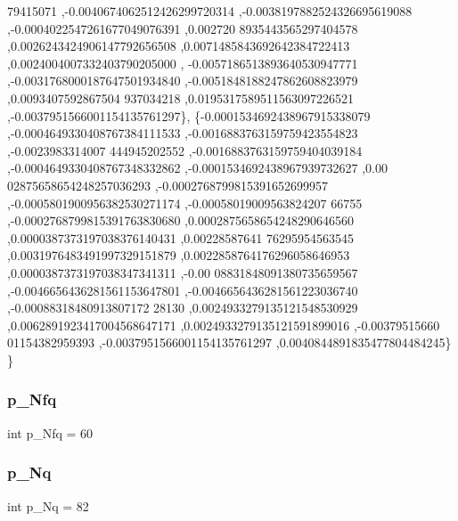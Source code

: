\begin{DoxyCode}
      79415071 ,-0.0040674062512426299720314 ,-0.0038197882524326695619088 ,-0.0004022547261677049076391 ,0.002720
      8935443565297404578 ,0.0026243424906147792656508 ,0.0071485843692642384722413 ,0.0024004007332403790205000 ,
      -0.0057186513893640530947771 ,-0.0031768000187647501934840 ,-0.0051848188247862608823979 ,0.0093407592867504
      937034218 ,0.0195317589511563097226521 ,-0.0037951566001154135761297\},
\{-0.0001534692438967915338079 ,-0.0004649330408767384111533 ,-0.0016883763159759423554823 ,-0.0023983314007
      444945202552 ,-0.0016883763159759404039184 ,-0.0004649330408767348332862 ,-0.0001534692438967939732627 ,0.00
      02875658654248257036293 ,-0.0002768799815391652699957 ,-0.0005801900956382530271174 ,-0.00058019009563824207
      66755 ,-0.0002768799815391763830680 ,0.0002875658654248290646560 ,0.0000387373197038376140431 ,0.00228587641
      76295954563545 ,0.0031976483491997329151879 ,0.0022858764176296058646953 ,0.0000387373197038347341311 ,-0.00
      08831848091380735659567 ,-0.0046656436281561153647801 ,-0.0046656436281561223036740 ,-0.00088318480913807172
      28130 ,0.0024933279135121548530929 ,0.0062891923417004568647171 ,0.0024933279135121591899016 ,-0.00379515660
      01154382959393 ,-0.0037951566001154135761297 ,0.0040844891835477804484245\}
\}
\end{DoxyCode}
\mbox{\label{a00461_aa030b0a9fe619a48647119bacea600e0}} 
\subsubsection{\texorpdfstring{p\+\_\+\+Nfq}{p\_Nfq}}
{\footnotesize\ttfamily int p\+\_\+\+Nfq = 60}

\mbox{\label{a00461_a207fd9268dfef5bf1505928a4f4c774a}} 
\subsubsection{\texorpdfstring{p\+\_\+\+Nq}{p\_Nq}}
{\footnotesize\ttfamily int p\+\_\+\+Nq = 82}

